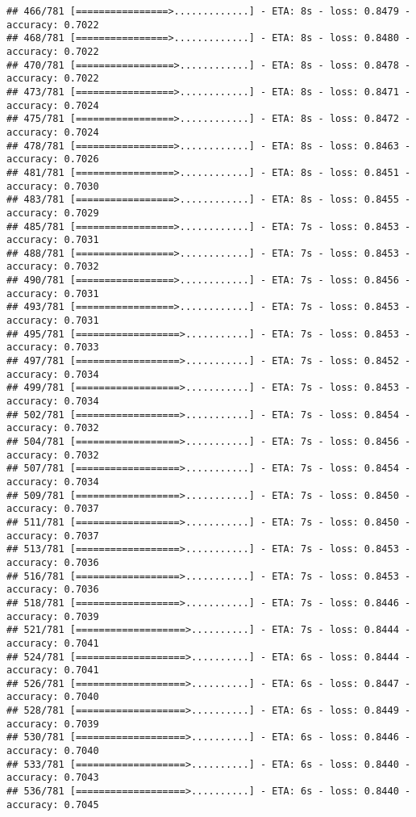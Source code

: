 \documentclass[
]{article}
\begin{document}
\begin{verbatim}
## 466/781 [================>.............] - ETA: 8s - loss: 0.8479 - accuracy: 0.7022
## 468/781 [================>.............] - ETA: 8s - loss: 0.8480 - accuracy: 0.7022
## 470/781 [=================>............] - ETA: 8s - loss: 0.8478 - accuracy: 0.7022
## 473/781 [=================>............] - ETA: 8s - loss: 0.8471 - accuracy: 0.7024
## 475/781 [=================>............] - ETA: 8s - loss: 0.8472 - accuracy: 0.7024
## 478/781 [=================>............] - ETA: 8s - loss: 0.8463 - accuracy: 0.7026
## 481/781 [=================>............] - ETA: 8s - loss: 0.8451 - accuracy: 0.7030
## 483/781 [=================>............] - ETA: 8s - loss: 0.8455 - accuracy: 0.7029
## 485/781 [=================>............] - ETA: 7s - loss: 0.8453 - accuracy: 0.7031
## 488/781 [=================>............] - ETA: 7s - loss: 0.8453 - accuracy: 0.7032
## 490/781 [=================>............] - ETA: 7s - loss: 0.8456 - accuracy: 0.7031
## 493/781 [=================>............] - ETA: 7s - loss: 0.8453 - accuracy: 0.7031
## 495/781 [==================>...........] - ETA: 7s - loss: 0.8453 - accuracy: 0.7033
## 497/781 [==================>...........] - ETA: 7s - loss: 0.8452 - accuracy: 0.7034
## 499/781 [==================>...........] - ETA: 7s - loss: 0.8453 - accuracy: 0.7034
## 502/781 [==================>...........] - ETA: 7s - loss: 0.8454 - accuracy: 0.7032
## 504/781 [==================>...........] - ETA: 7s - loss: 0.8456 - accuracy: 0.7032
## 507/781 [==================>...........] - ETA: 7s - loss: 0.8454 - accuracy: 0.7034
## 509/781 [==================>...........] - ETA: 7s - loss: 0.8450 - accuracy: 0.7037
## 511/781 [==================>...........] - ETA: 7s - loss: 0.8450 - accuracy: 0.7037
## 513/781 [==================>...........] - ETA: 7s - loss: 0.8453 - accuracy: 0.7036
## 516/781 [==================>...........] - ETA: 7s - loss: 0.8453 - accuracy: 0.7036
## 518/781 [==================>...........] - ETA: 7s - loss: 0.8446 - accuracy: 0.7039
## 521/781 [===================>..........] - ETA: 7s - loss: 0.8444 - accuracy: 0.7041
## 524/781 [===================>..........] - ETA: 6s - loss: 0.8444 - accuracy: 0.7041
## 526/781 [===================>..........] - ETA: 6s - loss: 0.8447 - accuracy: 0.7040
## 528/781 [===================>..........] - ETA: 6s - loss: 0.8449 - accuracy: 0.7039
## 530/781 [===================>..........] - ETA: 6s - loss: 0.8446 - accuracy: 0.7040
## 533/781 [===================>..........] - ETA: 6s - loss: 0.8440 - accuracy: 0.7043
## 536/781 [===================>..........] - ETA: 6s - loss: 0.8440 - accuracy: 0.7045

\end{verbatim}
\end{document}
